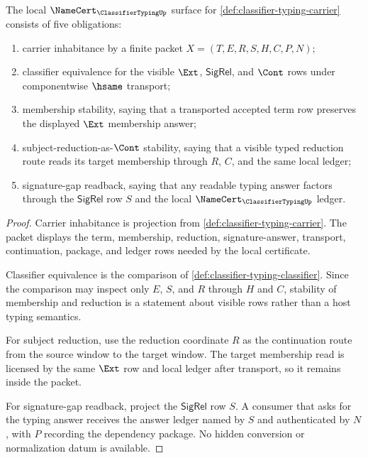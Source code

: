 \begin{theorem}
\label{thm:classifier-typing-namecert-obligations}
The local $\NameCert_{\ClassifierTypingUp}$ surface for \autoref{def:classifier-typing-carrier} consists of five obligations:
\begin{enumerate}
\item carrier inhabitance by a finite packet $X=(T,E,R,S,H,C,P,N)$;
\item classifier equivalence for the visible $\Ext$, $\mathsf{SigRel}$, and $\Cont$ rows under componentwise $\hsame$ transport;
\item membership stability, saying that a transported accepted term row preserves the displayed $\Ext$ membership answer;
\item subject-reduction-as-$\Cont$ stability, saying that a visible typed reduction route reads its target membership through $R$, $C$, and the same local ledger;
\item signature-gap readback, saying that any readable typing answer factors through the $\mathsf{SigRel}$ row $S$ and the local $\NameCert_{\ClassifierTypingUp}$ ledger.
\end{enumerate}
\end{theorem}
\begin{proof}
Carrier inhabitance is projection from \autoref{def:classifier-typing-carrier}. The packet displays the term, membership, reduction, signature-answer, transport, continuation, package, and ledger rows needed by the local certificate.

Classifier equivalence is the comparison of \autoref{def:classifier-typing-classifier}. Since the comparison may inspect only $E$, $S$, and $R$ through $H$ and $C$, stability of membership and reduction is a statement about visible rows rather than a host typing semantics.

For subject reduction, use the reduction coordinate $R$ as the continuation route from the source window to the target window. The target membership read is licensed by the same $\Ext$ row and local ledger after transport, so it remains inside the packet.

For signature-gap readback, project the $\mathsf{SigRel}$ row $S$. A consumer that asks for the typing answer receives the answer ledger named by $S$ and authenticated by $N$, with $P$ recording the dependency package. No hidden conversion or normalization datum is available.
\end{proof}

